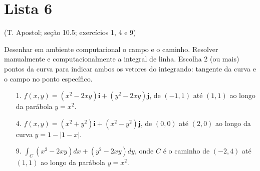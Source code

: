 \documentclass[../main.tex]{subfiles}
\begin{document}
	
	\section{Lista 6}
	\begin{exercicio}{1}
		(T. Apostol; seção 10.5; exercícios 1, 4 e 9)
		
		Desenhar em ambiente computacional o campo e o caminho. Resolver manualmente e computacionalmente a integral de linha. Escolha 2 (ou mais) pontos da curva para indicar ambos os vetores do integrando: tangente da curva e o campo no ponto específico.
		
		\begin{enumerate}
			\item[1.] $f(x,y)=(x^2-2xy)\textbf{i} + (y^2-2xy)\textbf{j}$, de $(-1,1)$ até $(1,1)$ ao longo da parábola $y=x^2$.
			\item[4.] $f(x,y)=(x^2+y^2)\textbf{i}+(x^2-y^2)\textbf{j}$, de $(0,0)$ até $(2,0)$ ao longo da curva $y=1-|1-x|$.
			\item[9.] $\int_C (x^2-2xy)dx+(y^2-2xy)dy$, onde $C$ é o caminho de $(-2,4)$ até $(1,1)$ ao longo da parábola $y=x^2$.   
		\end{enumerate}
	\end{exercicio}
\end{document}
